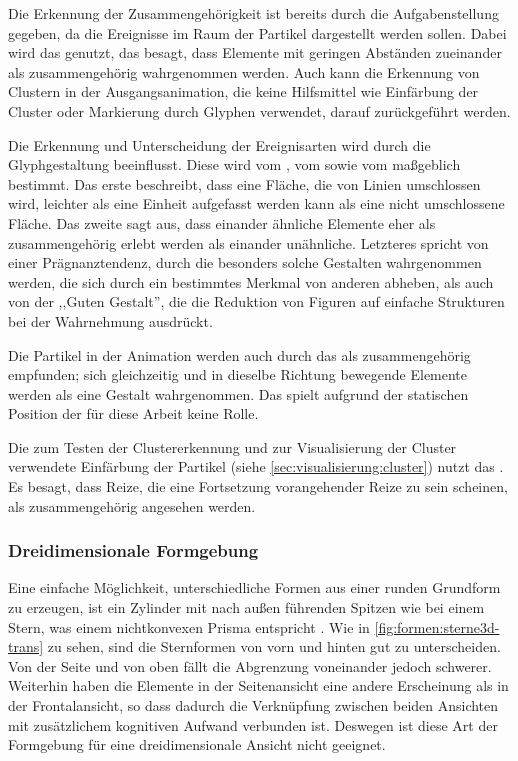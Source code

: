 Die Erkennung der Zusammengehörigkeit ist bereits durch die Aufgabenstellung gegeben, da die Ereignisse im Raum der Partikel dargestellt werden sollen. Dabei wird das  genutzt, das besagt, dass Elemente mit geringen Abständen zueinander als zusammengehörig wahrgenommen werden. Auch kann die Erkennung von Clustern in der Ausgangsanimation, die keine Hilfsmittel wie Einfärbung der Cluster oder Markierung durch Glyphen verwendet, darauf zurückgeführt werden.

Die Erkennung und Unterscheidung der Ereignisarten wird durch die Glyphgestaltung beeinflusst. Diese wird vom , vom  sowie vom  maßgeblich bestimmt. Das erste beschreibt, dass eine Fläche, die von Linien umschlossen wird, leichter als eine Einheit aufgefasst werden kann als eine nicht umschlossene Fläche. Das zweite sagt aus, dass einander ähnliche Elemente eher als zusammengehörig erlebt werden als einander unähnliche. Letzteres spricht von einer Prägnanztendenz, durch die besonders solche Gestalten wahrgenommen werden, die sich durch ein bestimmtes Merkmal von anderen abheben, als auch von der ,,Guten Gestalt'', die die Reduktion von Figuren auf einfache Strukturen bei der Wahrnehmung ausdrückt.

Die Partikel in der Animation werden auch durch das  als zusammengehörig empfunden; sich gleichzeitig und in dieselbe Richtung bewegende Elemente werden als eine Gestalt wahrgenommen. Das spielt aufgrund der statischen Position der  für diese Arbeit keine Rolle.

Die zum Testen der Clustererkennung und zur Visualisierung der Cluster verwendete Einfärbung der Partikel (siehe \autoref{sec:visualisierung:cluster}) nutzt das . Es besagt, dass Reize, die eine Fortsetzung vorangehender Reize zu sein scheinen, als zusammengehörig angesehen werden.


\subsubsection{Dreidimensionale Formgebung}\label{sec:grundlagen:3Dformgebung}
Eine einfache Möglichkeit, unterschiedliche Formen aus einer runden Grundform zu erzeugen, ist ein Zylinder mit nach außen führenden Spitzen wie bei einem Stern, was einem nichtkonvexen Prisma entspricht \cite{UniformPolyhedra}. Wie in \autoref{fig:formen:sterne3d-trans} zu sehen, sind die Sternformen von vorn und hinten gut zu unterscheiden. Von der Seite und von oben fällt die Abgrenzung voneinander jedoch schwerer. Weiterhin haben die Elemente in der Seitenansicht eine andere Erscheinung als in der Frontalansicht, so dass dadurch die Verknüpfung zwischen beiden Ansichten mit zusätzlichem kognitiven Aufwand verbunden ist. Deswegen ist diese Art der Formgebung für eine dreidimensionale Ansicht nicht geeignet.

